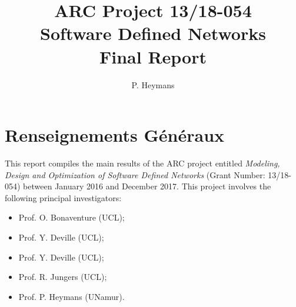 \documentclass[a4paper]{article}
\title{\textbf{ARC Project 13/18-054}\\ 
   \textbf{Software Defined Networks}\\
   Final Report
}
\date{}
\author{P. Heymans}
\begin{document}
\maketitle

\section{Renseignements Généraux}

This report compiles the main results of the ARC project entitled 
\emph{Modeling, Design and Optimization of Software Defined Networks} 
(Grant Number: 13/18-054) between January 2016 and December 2017. 
This project involves the following principal investigators: 
\begin{itemize}
   \item Prof. O. Bonaventure (UCL);
   \item Prof. Y. Deville (UCL);
   \item Prof. Y. Deville (UCL);
   \item Prof. R. Jungers (UCL);
   \item Prof. P. Heymans (UNamur).
\end{itemize}


\newpage


\end{document}
